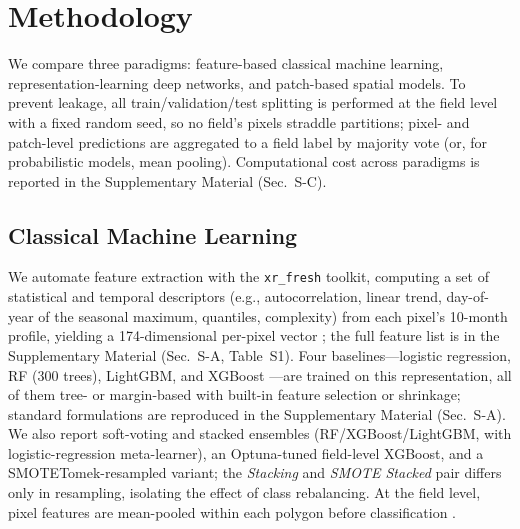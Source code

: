 \documentclass[preprint,authoryear]{elsarticle}
\begin{document}
\section{Methodology}
We compare three paradigms: feature-based classical machine learning, representation-learning deep networks, and patch-based spatial models. To prevent leakage, all train/validation/test splitting is performed at the field level with a fixed random seed, so no field's pixels straddle partitions; pixel- and patch-level predictions are aggregated to a field label by majority vote (or, for probabilistic models, mean pooling). Computational cost across paradigms is reported in the Supplementary Material (Sec.~S-C).

\subsection{Classical Machine Learning}
We automate feature extraction with the \texttt{xr\_fresh} toolkit, computing a set of statistical and temporal descriptors (e.g., autocorrelation, linear trend, day-of-year of the seasonal maximum, quantiles, complexity) from each pixel's 10-month profile, yielding a 174-dimensional per-pixel vector \citep{mann2023, mann2025}; the full feature list is in the Supplementary Material (Sec.~S-A, Table~S1). Four baselines---logistic regression, RF (300 trees), LightGBM, and XGBoost \citep{james2013, breiman2001, ke2017, chen2016, friedman2001}---are trained on this representation, all of them tree- or margin-based with built-in feature selection or shrinkage; standard formulations are reproduced in the Supplementary Material (Sec.~S-A). We also report soft-voting and stacked ensembles (RF/XGBoost/LightGBM, with logistic-regression meta-learner), an Optuna-tuned field-level XGBoost, and a SMOTETomek-resampled variant; the \emph{Stacking} and \emph{SMOTE Stacked} pair differs only in resampling, isolating the effect of class rebalancing. At the field level, pixel features are mean-pooled within each polygon before classification \citep{penabarragan2011}.
\end{document}
